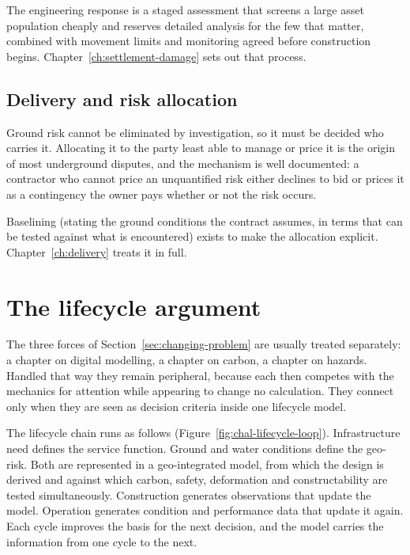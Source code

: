 The engineering response is a staged assessment that screens a large asset
population cheaply and reserves detailed analysis for the few that matter,
combined with movement limits and monitoring agreed before construction
begins. Chapter~\ref{ch:settlement-damage} sets out that process.

\subsection{Delivery and risk allocation}
\label{sec:delivery-challenge}

Ground risk cannot be eliminated by investigation, so it must be decided who
carries it. Allocating it to the party least able to manage or price it is the
origin of most underground disputes, and the mechanism is well documented: a
contractor who cannot price an unquantified risk either declines to bid or
prices it as a contingency the owner pays whether or not the risk occurs.

Baselining (stating the ground conditions the contract assumes, in terms
that can be tested against what is encountered) exists to make the
allocation explicit. Chapter~\ref{ch:delivery} treats it in full.

\section{The lifecycle argument}
\label{sec:lifecycle-argument}

The three forces of Section~\ref{sec:changing-problem} are usually treated separately: a chapter on digital
modelling, a chapter on carbon, a chapter on hazards. Handled that way they
remain peripheral, because each then competes with the mechanics for attention
while appearing to change no calculation. They connect only when they are seen as
decision criteria inside one lifecycle model.

The lifecycle chain runs as follows (Figure~\ref{fig:chal-lifecycle-loop}). Infrastructure need defines the service function.
Ground and water conditions define the geo-risk. Both are represented in a
geo-integrated model, from which the design is derived and against which
carbon, safety, deformation and constructability are tested simultaneously.
Construction generates observations that update the model. Operation generates
condition and performance data that update it again. Each cycle improves the
basis for the next decision, and the model carries the information from one
cycle to the next.

